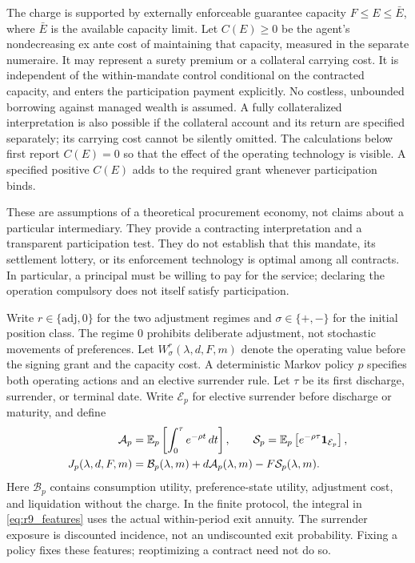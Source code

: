 The charge is supported by externally enforceable guarantee capacity $F\leq E\leq\bar E$, where $\bar E$ is the available capacity limit. Let $C(E)\geq0$ be the agent's nondecreasing ex ante cost of maintaining that capacity, measured in the separate numeraire. It may represent a surety premium or a collateral carrying cost. It is independent of the within-mandate control conditional on the contracted capacity, and enters the participation payment explicitly. No costless, unbounded borrowing against managed wealth is assumed. A fully collateralized interpretation is also possible if the collateral account and its return are specified separately; its carrying cost cannot be silently omitted. The calculations below first report $C(E)=0$ so that the effect of the operating technology is visible. A specified positive $C(E)$ adds to the required grant whenever participation binds.

These are assumptions of a theoretical procurement economy, not claims about a particular intermediary. They provide a contracting interpretation and a transparent participation test. They do not establish that this mandate, its settlement lottery, or its enforcement technology is optimal among all contracts. In particular, a principal must be willing to pay for the service; declaring the operation compulsory does not itself satisfy participation.

Write $r\in\{\mathrm{adj},0\}$ for the two adjustment regimes and $\sigma\in\{+,-\}$ for the initial position class. The regime $0$ prohibits deliberate adjustment, not stochastic movements of preferences. Let $W^r_\sigma(\lambda,d,F,m)$ denote the operating value before the signing grant and the capacity cost. A deterministic Markov policy $p$ specifies both operating actions and an elective surrender rule. Let $\tau$ be its first discharge, surrender, or terminal date. Write $\mathcal E_p$ for elective surrender before discharge or maturity, and define
\begin{align}
 \mathcal A_p&=\mathbb E_p\left[\int_0^\tau e^{-\rho t}\,dt\right],\qquad
 \mathcal S_p=\mathbb E_p\left[e^{-\rho\tau}\mathbf 1_{\mathcal E_p}\right],\label{eq:r9_features}\\
 J_p(\lambda,d,F,m)&=\mathcal B_p(\lambda,m)+d\mathcal A_p(\lambda,m)-F\mathcal S_p(\lambda,m).
 \label{eq:r9_stop_affine}
\end{align}
Here $\mathcal B_p$ contains consumption utility, preference-state utility, adjustment cost, and liquidation without the charge. In the finite protocol, the integral in \eqref{eq:r9_features} uses the actual within-period exit annuity. The surrender exposure is discounted incidence, not an undiscounted exit probability. Fixing a policy fixes these features; reoptimizing a contract need not do so.


